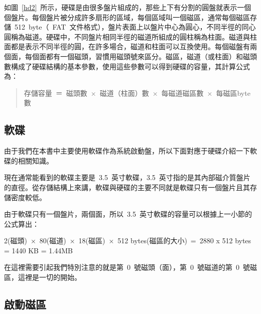 如圖~\ref{hd2}~所示，硬碟是由很多盤片組成的，那些上下有分割的圓盤就表示一個個盤片。每個盤片被分成許多扇形的區域，每個區域叫一個磁區，通常每個磁區存儲~512~byte（~FAT~文件格式），盤片表面上以盤片中心為圓心，不同半徑的同心圓稱為磁道。硬碟中，不同盤片相同半徑的磁道所組成的圓柱稱為柱面。磁道與柱面都是表示不同半徑的圓，在許多場合，磁道和柱面可以互換使用。每個磁盤有兩個面，每個面都有一個磁頭，習慣用磁頭號來區分。磁區，磁道（或柱面）和磁頭數構成了硬碟結構的基本參數，使用這些參數可以得到硬碟的容量，其計算公式為：
\begin{quote}
存儲容量~＝~磁頭數~×~磁道（柱面）數~×~每磁道磁區數~×~每磁區byte數
\end{quote}


\subsection{軟碟}
由于我們在本書中主要使用軟碟作為系統啟動盤，所以下面對應于硬碟介紹一下軟碟的相關知識。


現在通常能看到的軟碟主要是~3.5~英寸軟碟，3.5~英寸指的是其內部磁介質盤片的直徑。從存儲結構上來講，軟碟與硬碟的主要不同就是軟碟只有一個盤片且其存儲密度較低。

由于軟碟只有一個盤片，兩個面，所以~3.5~英寸軟碟的容量可以根據上一小節的公式算出：

2(磁頭)~×~80(磁道)~×~18(磁區)~×~512 bytes(磁區的大小)~=~2880 x 512 bytes = 1440 KB = 1.44MB

在這裡需要引起我們特別注意的就是第~0~號磁頭（面），第~0~號磁道的第~0~號磁區，這裡是一切的開始。

\subsection{啟動磁區}

